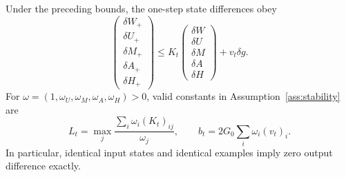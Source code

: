 \begin{proposition}
\label{prop:explicit-state-constants}
Under the preceding bounds, the one-step state differences obey
\begin{equation}
 \begin{pmatrix}\delta W_+\\\delta U_+\\\delta M_+\\\delta A_+\\\delta H_+\end{pmatrix}
 \le K_t\begin{pmatrix}\delta W\\\delta U\\\delta M\\\delta A\\\delta H\end{pmatrix}
                       +v_t\delta g.\label{eq:matrix-state-bound}
\end{equation}
For $\omega=(1,\omega_U,\omega_M,\omega_A,\omega_H)>0$,
valid constants in Assumption~\ref{ass:stability} are
\begin{equation}
 L_t=\max_j\frac{\sum_i\omega_i(K_t)_{ij}}{\omega_j},\qquad
 b_t=2G_0\sum_i\omega_i(v_t)_i.\label{eq:explicit-L-b}
\end{equation}
In particular, identical input states and identical examples imply zero
output difference exactly.
\end{proposition}
